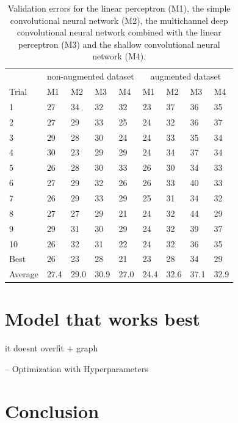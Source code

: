 \documentclass{article}
\begin{document}
 \begin{table}
 \begin{center}
    \begin{tabular}{ l l l l l l l l l}
\toprule
     $ $ & \multicolumn{4}{c}{non-augmented dataset} & \multicolumn{4}{c}{augmented dataset} \\
     \cmidrule(lr){2-5}
     \cmidrule(lr){6-9}
    Trial & M1 & M2 & M3 & M4 & M1 & M2 & M3 & M4  \\
\midrule
    1 & 27 & 34 & 32 & 32 & 23 & 37 & 36 & 35 \\
    2 & 27 & 29 & 33 & 25 & 24 & 32 & 36 & 37 \\
    3 & 29 & 28 & 30 & 24 & 24 & 33 & 35 & 34\\
    4 & 30 & 23 & 29 & 29 & 24 & 34 & 37 & 34\\
    5 & 26 & 28 & 30 & 33 & 26 & 30 & 34 & 33\\
    6 & 27 & 29 & 32 & 26 & 26 & 33 & 40 & 33\\
    7 & 26 & 29 & 33 & 29 & 25 & 31 & 34 & 32\\
    8 & 27 & 27 & 29 & 21 & 24 & 32 & 44 & 29\\
    9 & 29 & 31 & 30 & 29 & 24 & 32 & 39 & 37 \\
    10 & 26 & 32 & 31 & 22 & 24 & 32 & 36 & 35\\
    \midrule
    Best & 26 & 23 & 28 & 21 & 23 & 28 & 34 & 29 \\
    Average & 27.4 & 29.0 & 30.9 & 27.0 & 24.4 & 32.6 & 37.1 & 32.9 \\
\bottomrule
    \end{tabular}
        \caption{Validation errors for the linear perceptron (M1), the simple convolutional neural network (M2), the multichannel deep convolutional neural network combined with the linear perceptron (M3) and the shallow convolutional neural network (M4).}
\end{center}
\label{tab_results}
\end{table}

  \section{Model that works best}\label{sec_themodel}
 
 it doesnt overfit + graph
 
 
 -- Optimization with Hyperparameters
  
 \section{Conclusion}\label{sec_conclusion}
 
 

 
  
  
  
\end{document}
